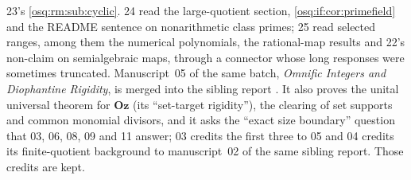 \documentclass[11pt,letterpaper]{article}
\numberwithin{equation}{section}
\theoremstyle{definition}
\theoremstyle{remark}
\theoremstyle{plain}
\newcommand{\Oz}{\mathbf{Oz}}
\begin{document}
23's \cref{osq:rm:sub:cyclic}. 24 read the large-quotient section, \cref{osq:if:cor:primefield} and the README sentence on nonarithmetic class
primes; 25 read selected ranges, among them the numerical polynomials, the rational-map results and 22's non-claim on semialgebraic maps, through a
connector whose long responses were sometimes truncated.
Manuscript~05 of the same batch, \emph{Omnific Integers and Diophantine Rigidity}, is merged
into the sibling report \cite{RepoOdg}. It also proves the unital universal theorem for $\Oz$
(its ``set-target rigidity''), the clearing of set supports and common monomial divisors, and it
asks the ``exact size boundary'' question that 03, 06, 08, 09 and 11 answer; 03 credits the
first three to 05 and 04 credits its finite-quotient background to manuscript~02 of the same
sibling report. Those credits are kept.
\end{document}
